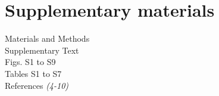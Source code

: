\documentclass[12pt,dvipsnames]{article}
\begin{document}

\clearpage
\section*{Supplementary materials}
Materials and Methods\\
Supplementary Text\\
Figs. S1 to S9\\
Tables S1 to S7\\
References \textit{(4-10)}
\clearpage
\setcounter{table}{0}
\renewcommand{\thetable}{S\arabic{table}}

\setcounter{figure}{0}
\renewcommand{\thefigure}{S\arabic{figure}}
\end{document}
